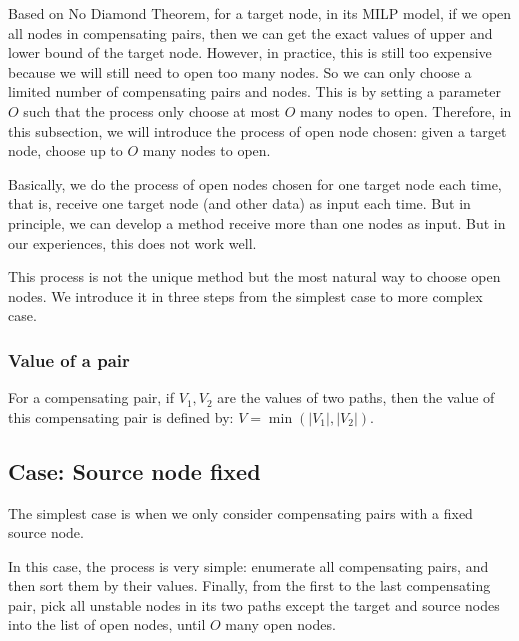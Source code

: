 \documentclass{llncs}
\begin{document}
Based on No Diamond Theorem, for a target node, in its MILP model, if we open all nodes in compensating pairs, then we can get the exact values of upper and lower bound of the target node. However, in practice, this is still too expensive because we will still need to open too many nodes. So we can only choose a limited number of compensating pairs and nodes. This is by setting a parameter $O$ such that the process only choose at most $O$ many nodes to open. Therefore, in this subsection, we will introduce the process of open node chosen: given a target node, choose up to $O$ many nodes to open.


Basically, we do the process of open nodes chosen for one target node each time, that is, receive one target node (and other data) as input each time. But in principle, we can develop a method receive more than one nodes as input. But in our experiences, this does not work well.  

This process is not the unique method but the most natural way to choose open nodes. We introduce it in three steps from the simplest case to more complex case.

\subsubsection*{Value of a pair}


For a compensating pair, if $V_1,V_2$ are the values of two paths, then the value of this compensating pair is defined by: $V=\min(|V_1|,|V_2|)$.


\subsection*{Case: Source node fixed}

The simplest case is when we only consider compensating pairs with a fixed source node. 

In this case, the process is very simple: enumerate all compensating pairs, and then sort them by their values. Finally, from the first to the last compensating pair, pick all unstable nodes in its two paths except the target and source nodes into the list of open nodes, until $O$ many open nodes. 
\end{document}
